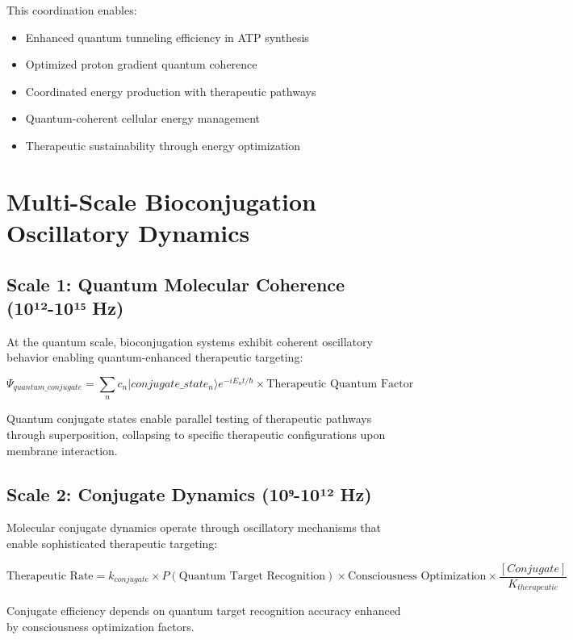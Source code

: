 \documentclass[12pt,a4paper]{article}
\begin{document}
This coordination enables:
\begin{itemize}
\item Enhanced quantum tunneling efficiency in ATP synthesis
\item Optimized proton gradient quantum coherence
\item Coordinated energy production with therapeutic pathways
\item Quantum-coherent cellular energy management
\item Therapeutic sustainability through energy optimization
\end{itemize}

\section{Multi-Scale Bioconjugation Oscillatory Dynamics}

\subsection{Scale 1: Quantum Molecular Coherence (10¹²-10¹⁵ Hz)}

At the quantum scale, bioconjugation systems exhibit coherent oscillatory behavior enabling quantum-enhanced therapeutic targeting:

\begin{equation}
\Psi_{quantum\_conjugate} = \sum_n c_n |conjugate\_state_n\rangle e^{-iE_n t/\hbar} \times \text{Therapeutic Quantum Factor}
\end{equation}

Quantum conjugate states enable parallel testing of therapeutic pathways through superposition, collapsing to specific therapeutic configurations upon membrane interaction.

\subsection{Scale 2: Conjugate Dynamics (10⁹-10¹² Hz)}

Molecular conjugate dynamics operate through oscillatory mechanisms that enable sophisticated therapeutic targeting:

\begin{equation}
\text{Therapeutic Rate} = k_{conjugate} \times P(\text{Quantum Target Recognition}) \times \text{Consciousness Optimization} \times \frac{[Conjugate]}{K_{therapeutic}}
\end{equation}

Conjugate efficiency depends on quantum target recognition accuracy enhanced by consciousness optimization factors.
\end{document}
